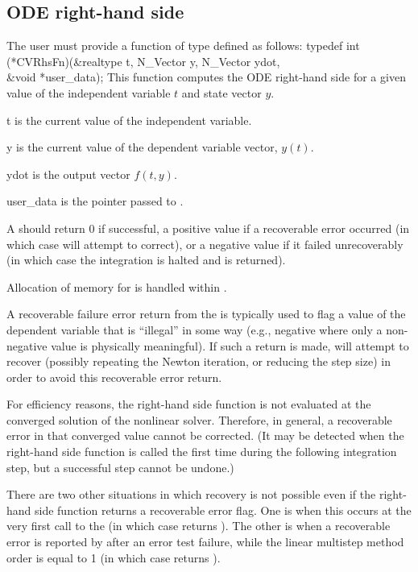 \subsection{ODE right-hand side} \label{ss:rhsFn}
The user must provide a function of type  defined as follows:
{
  typedef int (*CVRhsFn)(&realtype t, N\_Vector y, N\_Vector ydot, \\
                         &void *user\_data);
}
{
  This function computes the ODE right-hand side for a given value
  of the independent variable $t$ and state vector $y$.
}
{
  \begin{args}
  \item[t]
    is the current value of the independent variable.
  \item[y]
    is the current value of the dependent variable vector, $y(t)$.
  \item[ydot]
    is the output vector $f(t,y)$.
  \item[user\_data]
    is the       
    pointer passed to .   
  \end{args}
}
{
  A  should return 0 if successful, a positive value if a recoverable
  error occurred (in which case {\cvode} will attempt to correct), or a negative 
  value if it failed unrecoverably (in which case the integration is halted and
   is returned).
}
{
  Allocation of memory for  is handled within {\cvode}.

  A recoverable failure error return from the  is typically used to
  flag a value of the dependent variable  that is ``illegal'' in
  some way (e.g., negative where only a non-negative value is physically
  meaningful).  If such a return is made, {\cvode} will attempt to recover
  (possibly repeating the Newton iteration, or reducing the step size)
  in order to avoid this recoverable error return.

  For efficiency reasons, the right-hand side function is not evaluated
  at the converged solution of the nonlinear solver. Therefore, in general, a
  recoverable error in that converged value cannot be corrected.  (It may be
  detected when the right-hand side function is called the first time during
  the following integration step, but a successful step cannot be undone.) 

  There are two other situations in which recovery is not possible
  even if the right-hand side function returns a recoverable error flag.
  One is when this occurs at the very first call to the 
  (in which case {\cvode} returns ).
  The other is when a recoverable error is reported by 
  after an error test failure, while the linear multistep method order is
  equal to 1 (in which case {\cvode} returns ).
}

